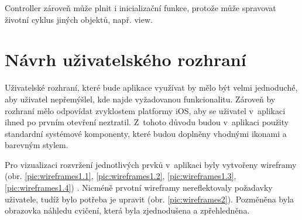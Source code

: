 \documentclass[thesis=B,czech]{FITthesis}[2012/06/26]
\begin{document}
	Controller zároveň může plnit i inicializační funkce, protože může spravovat životní cyklus jiných objektů, např. view.

	\section{Návrh uživatelského rozhraní}

	Uživatelské rozhraní, které bude aplikace využívat by mělo být velmi jednoduché, aby uživatel nepřemýšlel, kde najde vyžadovanou funkcionalitu. Zároveň by rozhraní mělo odpovídat zvyklostem platformy iOS, aby se uživatel v~aplikaci ihned po prvním otevření neztratil. Z~tohoto důvodu budou v~aplikaci použity standardní systémové komponenty, které budou doplněny vhodnými ikonami a barevným stylem.

	Pro vizualizaci rozvržení jednotlivých prvků v~aplikaci byly vytvořeny wireframy (obr. \ref{pic:wireframes1.1}, \ref{pic:wireframes1.2}, \ref{pic:wireframes1.3}, \ref{pic:wireframes1.4}) \cite{moqupsOnline}. Nicméně prvotní wireframy nereflektovaly požadavky uživatele, tudíž bylo potřeba je upravit (obr. \ref{pic:wireframes2}). Pozměněna byla obrazovka náhledu cvičení, která byla zjednodušena a zpřehledněna.
\end{document}
